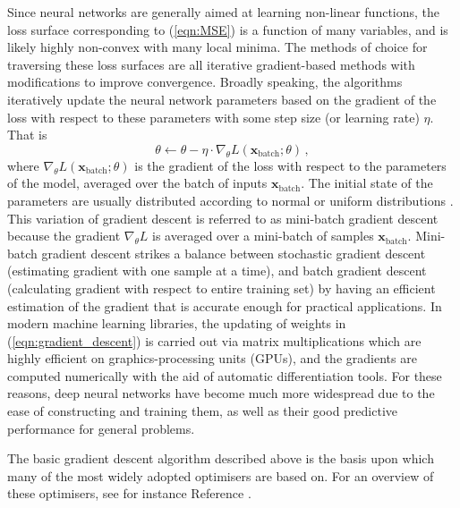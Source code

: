 \documentclass[main.tex]{subfiles}
\begin{document}
    Since neural networks are generally aimed at
    learning non-linear functions, the loss surface
    corresponding to (\ref{eqn:MSE}) is
    a function of many variables, and is likely highly
    non-convex with many local minima.
    The methods of choice for traversing these loss surfaces
    are all iterative gradient-based methods with modifications
    to improve convergence. Broadly speaking, the algorithms
    iteratively update the neural network parameters based on the
    gradient of the loss with respect to these parameters
    with some step size (or learning rate) $\eta$. That is
    \begin{equation}\label{eqn:gradient_descent}
        \theta \gets \theta - \eta \cdot \nabla_{\theta} L(\mathbf{x}_{\mathrm{batch}}; \theta) \, ,
    \end{equation}
    where $\nabla_{\theta}L(\mathbf{x}_{\mathrm{batch}}; \theta)$ is the
    gradient of the loss with respect to the parameters of the
    model, averaged over the batch of inputs $\mathbf{x}_{\mathrm{batch}}$.
    The initial state of the parameters
    are usually distributed according to normal
    or uniform distributions \cite{pmlr-v9-glorot10a,he_initialiser}.
    This variation of gradient descent is referred to
    as mini-batch gradient descent because the gradient
    $\nabla_{\theta}L$ is averaged over a mini-batch of
    samples $\mathbf{x}_{\mathrm{batch}}$. Mini-batch gradient
    descent strikes a balance between stochastic gradient
    descent (estimating gradient with one sample at a time),
    and batch gradient descent (calculating gradient with
    respect to entire training set) by having an efficient
    estimation of the gradient that is accurate enough
    for practical applications. In modern machine learning
    libraries, the updating of weights in (\ref{eqn:gradient_descent})
    is carried out via matrix multiplications which are
    highly efficient on graphics-processing units (GPUs),
    and the gradients are computed numerically with the aid
    of automatic differentiation tools. For these reasons, deep
    neural networks have become much more widespread due
    to the ease of constructing and training them, as well
    as their good predictive performance for general problems.

    The basic gradient descent algorithm described above
    is the basis upon which many of the most widely
    adopted optimisers \cite{kiefer1952stochastic,hintonrmsprop,Kingma:2014vow}
    are based on. For an overview of these optimisers, see for instance
    Reference \cite{Ruder:2016lil}.
\end{document}
